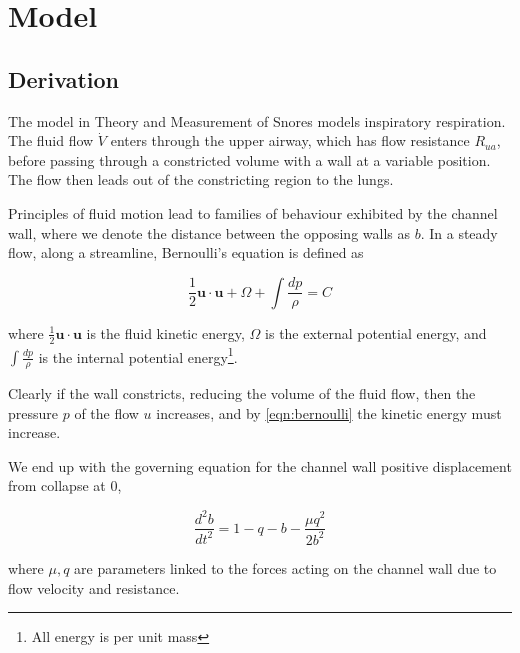 \documentclass{article}
\begin{document}
\section{Model}

\subsection{Derivation}

The model in Theory and Measurement of Snores \cite{gavriely_jensen_1993} models inspiratory respiration.
The fluid flow $\dot{V}$ enters through the upper airway, which has flow resistance $R_{ua}$,
before passing through a constricted volume with a wall at a variable position.
The flow then leads out of the constricting region to the lungs.

Principles of fluid motion lead to families of behaviour exhibited by the channel wall,
where we denote the distance between the opposing walls as $b$.
In a steady flow, along a streamline, Bernoulli's equation is defined as 

\begin{equation}
    \frac{1}{2}\mathbf{u}\cdot\mathbf{u} + \Omega + \int\frac{dp}{\rho} = C
    \label{eqn:bernoulli}
\end{equation}

where $\frac{1}{2}\mathbf{u}\cdot\mathbf{u}$ is the fluid kinetic energy, 
$\Omega$ is the external potential energy,
and $\int\frac{dp}{\rho}$ is the internal potential energy\footnote{All energy is per unit mass}.

Clearly if the wall constricts, reducing the volume of the fluid flow,
then the pressure $p$ of the flow $u$ increases,
and by \ref{eqn:bernoulli} the kinetic energy must increase.



We end up with the governing equation for the channel wall positive displacement from collapse at $0$,

\begin{equation}
    \frac{d^2b}{dt^2} = 1 - q - b - \frac{\mu q^2}{2b^2}
    \label{eqn:master}
\end{equation}

where $\mu, q$ are parameters linked to the forces acting on the channel wall due to flow velocity and resistance.
\end{document}
